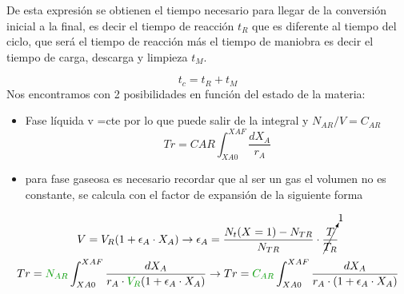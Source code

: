 \begin{raggedright}
    De esta expresión se obtienen el tiempo necesario para llegar de la conversión inicial a la final, es decir el tiempo de reacción $t_R$ que es diferente al tiempo
    del ciclo, que será el tiempo de reacción más el tiempo de maniobra es decir el tiempo de carga, descarga y limpieza $t_M$.

    \begin{equation}
        t_c = t_R + t_M
    \end{equation}
    \newpage
    Nos encontramos con 2 posibilidades en función del estado de la materia:
    \begin{itemize}
        \item Fase líquida v =cte por lo que puede salir de la integral y $N_{AR}/V = C_{AR}$
              \begin{equation}
                  Tr = CAR \int_{XA0}^{XAF} \frac{dX_A}{r_A}
              \end{equation}
        \item para fase gaseosa es necesario recordar que al ser un gas el volumen no es constante, se calcula con el factor de expansión de la siguiente forma
    \end{itemize}
    \begin{equation}
        V = V_R(1 + \epsilon_A \cdot X_A) \rightarrow \epsilon_A = \frac{N_t (X=1)-N_{TR}}{N_{TR}} \cdot \cancelto{1}{\frac{T}{T_R}}
    \end{equation}
    \begin{equation}
        Tr = \textcolor{darkgreen}{N_{AR}} \int_{XA0}^{XAF} \frac{dX_A}{r_A \cdot \textcolor{darkgreen}{V_R}(1 + \epsilon_A \cdot X_A)} \rightarrow Tr = \textcolor{darkgreen}{C_{AR}} \int_{XA0}^{XAF} \frac{dX_A}{r_A \cdot (1 + \epsilon_A \cdot X_A)}
    \end{equation}

\end{raggedright}

